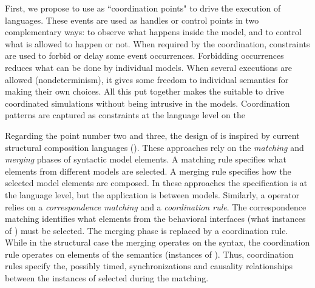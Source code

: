 First, we propose to use \dse as ``coordination points" to drive the execution of languages. These events are used as handles or control points in two complementary ways: to observe what happens inside the model, and to control what is allowed to happen or not. When required by the coordination, constraints are used to forbid or delay some event occurrences. Forbidding occurrences reduces what can be done by individual models. When several executions are allowed
(nondeterminism), it gives some freedom to individual semantics for making their own choices. All this put together makes the \dse suitable to drive coordinated simulations without being intrusive in the models. Coordination patterns are captured as constraints at the language level on the \dse

Regarding the point number two and three, the design of \bcool is inspired by current structural composition languages (\eg\cite{epsilon,kompose}). These approaches rely on the \emph{matching} and \emph{merging} phases of syntactic model elements. A matching rule specifies what elements from different models are selected. A merging rule specifies how the selected model elements are composed. In these approaches the specification is at the language level, but the application is between models. Similarly, a \bcool operator relies on a \emph{correspondence matching} and a \emph{coordination rule}. The correspondence matching identifies what elements from the behavioral interfaces (\ie what instances of \dse) must be selected. The merging phase is replaced by a coordination rule. While in the structural case the merging operates on the syntax, the coordination rule operates on elements of the semantics (\ie instances of \dse). Thus, coordination rules specify the, possibly timed, synchronizations and causality relationships between the instances of \dse selected during the matching.
